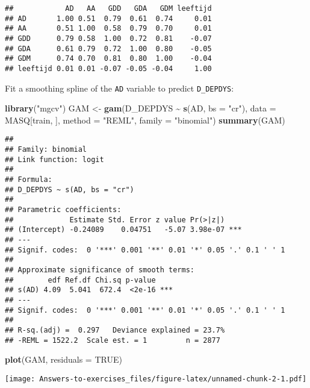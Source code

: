 \documentclass[
]{article}
\newenvironment{Shaded}{\begin{snugshade}}{\end{snugshade}}
\newcommand{\AttributeTok}[1]{\textcolor[rgb]{0.13,0.29,0.53}{#1}}
\newcommand{\ConstantTok}[1]{\textcolor[rgb]{0.56,0.35,0.01}{#1}}
\newcommand{\FunctionTok}[1]{\textcolor[rgb]{0.13,0.29,0.53}{\textbf{#1}}}
\newcommand{\NormalTok}[1]{#1}
\newcommand{\OtherTok}[1]{\textcolor[rgb]{0.56,0.35,0.01}{#1}}
\newcommand{\SpecialCharTok}[1]{\textcolor[rgb]{0.81,0.36,0.00}{\textbf{#1}}}
\newcommand{\StringTok}[1]{\textcolor[rgb]{0.31,0.60,0.02}{#1}}
\begin{document}
\begin{verbatim}
##            AD   AA   GDD   GDA   GDM leeftijd
## AD       1.00 0.51  0.79  0.61  0.74     0.01
## AA       0.51 1.00  0.58  0.79  0.70     0.01
## GDD      0.79 0.58  1.00  0.72  0.81    -0.07
## GDA      0.61 0.79  0.72  1.00  0.80    -0.05
## GDM      0.74 0.70  0.81  0.80  1.00    -0.04
## leeftijd 0.01 0.01 -0.07 -0.05 -0.04     1.00
\end{verbatim}

Fit a smoothing spline of the \texttt{AD} variable to predict
\texttt{D\_DEPDYS}:

\begin{Shaded}
\begin{Highlighting}[]
\FunctionTok{library}\NormalTok{(}\StringTok{"mgcv"}\NormalTok{)}
\NormalTok{GAM }\OtherTok{\textless{}{-}} \FunctionTok{gam}\NormalTok{(D\_DEPDYS }\SpecialCharTok{\textasciitilde{}} \FunctionTok{s}\NormalTok{(AD, }\AttributeTok{bs =} \StringTok{"cr"}\NormalTok{), }
           \AttributeTok{data =}\NormalTok{ MASQ[train, ], }\AttributeTok{method =} \StringTok{"REML"}\NormalTok{, }\AttributeTok{family =} \StringTok{"binomial"}\NormalTok{)}
\FunctionTok{summary}\NormalTok{(GAM)}
\end{Highlighting}
\end{Shaded}

\begin{verbatim}
## 
## Family: binomial 
## Link function: logit 
## 
## Formula:
## D_DEPDYS ~ s(AD, bs = "cr")
## 
## Parametric coefficients:
##             Estimate Std. Error z value Pr(>|z|)    
## (Intercept) -0.24089    0.04751   -5.07 3.98e-07 ***
## ---
## Signif. codes:  0 '***' 0.001 '**' 0.01 '*' 0.05 '.' 0.1 ' ' 1
## 
## Approximate significance of smooth terms:
##        edf Ref.df Chi.sq p-value    
## s(AD) 4.09  5.041  672.4  <2e-16 ***
## ---
## Signif. codes:  0 '***' 0.001 '**' 0.01 '*' 0.05 '.' 0.1 ' ' 1
## 
## R-sq.(adj) =  0.297   Deviance explained = 23.7%
## -REML = 1522.2  Scale est. = 1         n = 2877
\end{verbatim}

\begin{Shaded}
\begin{Highlighting}[]
\FunctionTok{plot}\NormalTok{(GAM, }\AttributeTok{residuals =} \ConstantTok{TRUE}\NormalTok{)}
\end{Highlighting}
\end{Shaded}

\texttt{[image: Answers-to-exercises\_files/figure-latex/unnamed-chunk-2-1.pdf]}
\end{document}
